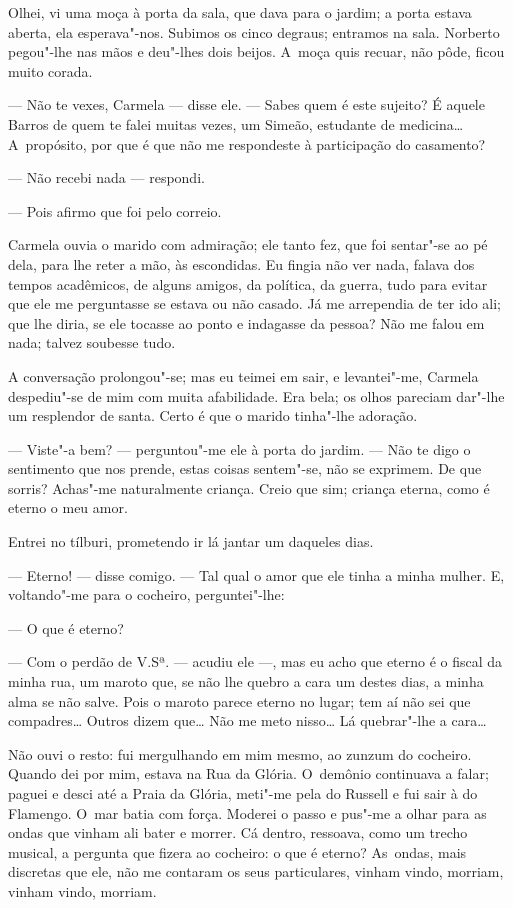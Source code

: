 \begin{linenumbers}
Olhei, vi uma moça à porta da sala, que dava para o jardim; a porta
estava aberta, ela esperava"-nos. Subimos os cinco degraus; entramos na
sala. Norberto pegou"-lhe nas mãos e deu"-lhes dois beijos. A~moça quis
recuar, não pôde, ficou muito corada.

--- Não te vexes, Carmela --- disse ele. --- Sabes quem é este sujeito? É
aquele Barros de quem te falei muitas vezes, um Simeão, estudante de
medicina\ldots{} A~propósito, por que é que não me respondeste à participação
do casamento?

--- Não recebi nada --- respondi.

--- Pois afirmo que foi pelo correio.

Carmela ouvia o marido com admiração; ele tanto fez, que foi sentar"-se
ao pé dela, para lhe reter a mão, às escondidas. Eu fingia não ver nada,
falava dos tempos acadêmicos, de alguns amigos, da política, da guerra,
tudo para evitar que ele me perguntasse se estava ou não casado. Já me
arrependia de ter ido ali; que lhe diria, se ele tocasse ao ponto e
indagasse da pessoa? Não me falou em nada; talvez soubesse tudo.

A conversação prolongou"-se; mas eu teimei em sair, e levantei"-me,
Carmela despediu"-se de mim com muita afabilidade. Era bela; os olhos
pareciam dar"-lhe um resplendor de santa. Certo é que o marido tinha"-lhe
adoração.

--- Viste"-a bem? --- perguntou"-me ele à porta do jardim. --- Não te digo o
sentimento que nos prende, estas coisas sentem"-se, não se exprimem. De
que sorris? Achas"-me naturalmente criança. Creio que sim; criança
eterna, como é eterno o meu amor.

Entrei no tílburi, prometendo ir lá jantar um daqueles dias.

--- Eterno! --- disse comigo. --- Tal qual o amor que ele tinha a minha
mulher. E, voltando"-me para o cocheiro, perguntei"-lhe:

--- O que é eterno?

--- Com o perdão de V.Sª. --- acudiu ele ---, mas eu acho que eterno é o
fiscal da minha rua, um maroto que, se não lhe quebro a cara um destes
dias, a minha alma se não salve. Pois o maroto parece eterno no lugar;
tem aí não sei que compadres\ldots{} Outros dizem que\ldots{} Não me meto nisso\ldots{}
Lá quebrar"-lhe a cara\ldots{}

Não ouvi o resto: fui mergulhando em mim mesmo, ao zunzum do cocheiro.
Quando dei por mim, estava na Rua da Glória. O~demônio continuava a
falar; paguei e desci até a Praia da Glória, meti"-me pela do Russell e
fui sair à do Flamengo. O~mar batia com força. Moderei o passo e pus"-me
a olhar para as ondas que vinham ali bater e morrer. Cá dentro,
ressoava, como um trecho musical, a pergunta que fizera ao cocheiro: o
que é eterno? As~ondas, mais discretas que ele, não me contaram os seus
particulares, vinham vindo, morriam, vinham vindo, morriam.


\end{linenumbers}
